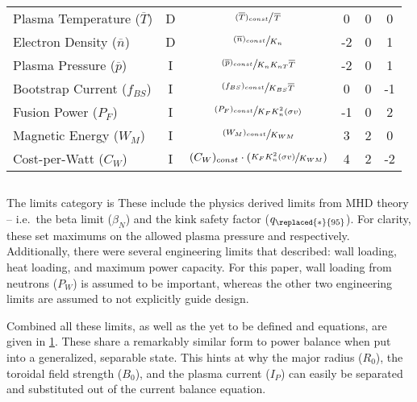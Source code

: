 \begin{table}[hb!]
\begin{spacing}{1.5}
\begin{tabular}{lccccc}
Plasma Temperature ($\overline T$) & D & $\sfrac{ (\overline T)_{const} }{ \, \overline T }$ & 0 & 0 & 0 \\
Electron Density ($\overline n$) & D & $\sfrac{ (\overline n)_{const} }{ K_n }$ & -2 & 0 & 1 \\
Plasma Pressure ($\overline p$) & I & $\sfrac{ (\overline p)_{const} }{ K_n K_{nT} \overline T }$ & -2 & 0 & 1
\\
Bootstrap Current ($f_{BS}$) & I & $\sfrac{ ( f_{BS} )_{const} }{ K_{BS} \overline T }$ & 0 & 0 & -1 \\
Fusion Power ($P_F$) & I & $\sfrac{ (P_F)_{const} }{ K_F K_n ^ 2 ( \sigma v ) }$ & -1 & 0 & 2 \\
Magnetic Energy ($W_M$) & I & $\sfrac{ (W_M)_{const} }{ K_{WM} }$ & 3 & 2 & 0 \\
Cost-per-Watt ($C_W$) & I & $ (C_W)_{const} \cdot \left( \sfrac{ K_F K_n ^ 2 ( \sigma v ) }{ K_{WM} } \right)$ & 4 & 2 & -2 \\
\end{tabular}
\end{spacing}
\label{table:eq}
\end{table}

\subsection{}

The limits category is  These include the physics derived limits from MHD theory -- i.e.\ the beta limit ($\beta_N$) and the kink safety factor ($q_{\replaced{*}{95}}$). For clarity, these set maximums on the allowed plasma pressure and  respectively. Additionally, there were several engineering limits that described: wall loading, heat loading, and maximum power capacity. For this paper, wall loading from neutrons ($P_W$) is assumed to be important, whereas the other two engineering limits are assumed to not explicitly guide design.

Combined all these limits, as well as the yet to be defined  and  equations, are given in \cref{table:eq}. These share a remarkably similar form to power balance when put into a generalized, separable state. This hints at why the major radius ($R_0$), the toroidal field strength ($B_0$), and the plasma current ($I_P$) can easily be separated and substituted out of the current balance equation.

